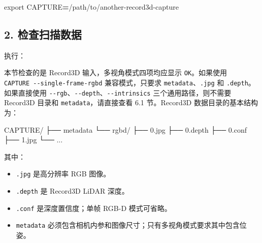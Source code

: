 \documentclass[
  chinese,
  11pt,
  a4paper,
]{article}
\newenvironment{Shaded}{\begin{snugshade}}{\end{snugshade}}
\newcommand{\AttributeTok}[1]{\textcolor[rgb]{0.13,0.29,0.53}{#1}}
\newcommand{\BuiltInTok}[1]{#1}
\newcommand{\KeywordTok}[1]{\textcolor[rgb]{0.13,0.29,0.53}{\textbf{#1}}}
\newcommand{\NormalTok}[1]{#1}
\newcommand{\OperatorTok}[1]{\textcolor[rgb]{0.81,0.36,0.00}{\textbf{#1}}}
\newcommand{\StringTok}[1]{\textcolor[rgb]{0.31,0.60,0.02}{#1}}
\newcommand{\VariableTok}[1]{\textcolor[rgb]{0.00,0.00,0.00}{#1}}
\providecommand{\tightlist}{%
  \setlength{\itemsep}{0pt}\setlength{\parskip}{0pt}}
\begin{document}
\begin{Shaded}
\begin{Highlighting}[]
\BuiltInTok{export} \VariableTok{CAPTURE}\OperatorTok{=}\NormalTok{/path/to/another{-}record3d{-}capture}
\end{Highlighting}
\end{Shaded}

\subsection{2.
检查扫描数据}\label{2-ux68c0ux67e5ux626bux63cfux6570ux636e}

执行：

\begin{Shaded}
\end{Shaded}

本节检查的是 Record3D 输入，多视角模式四项均应显示 \texttt{OK}。如果使用
\texttt{CAPTURE\ -\/-single-frame-rgbd} 兼容模式，只要求
\texttt{metadata}、\texttt{.jpg} 和 \texttt{.depth}。 如果直接使用
\texttt{-\/-rgb}、\texttt{-\/-depth}、\texttt{-\/-intrinsics}
三个通用路径，则不需要 Record3D 目录和 \texttt{metadata}，请直接查看 6.1
节。Record3D 数据目录的基本结构为：

\begin{Shaded}
\begin{Highlighting}[]
\NormalTok{CAPTURE/}
\NormalTok{├── metadata}
\NormalTok{└── rgbd/}
\NormalTok{    ├── 0.jpg}
\NormalTok{    ├── 0.depth}
\NormalTok{    ├── 0.conf}
\NormalTok{    ├── 1.jpg}
\NormalTok{    └── ...}
\end{Highlighting}
\end{Shaded}

其中：

\begin{itemize}
\tightlist
\item
  \texttt{.jpg} 是高分辨率 RGB 图像。
\item
  \texttt{.depth} 是 Record3D LiDAR 深度。
\item
  \texttt{.conf} 是深度置信度；单帧 RGB-D 模式可省略。
\item
  \texttt{metadata}
  必须包含相机内参和图像尺寸；只有多视角模式要求其中包含位姿。
\end{itemize}
\end{document}
